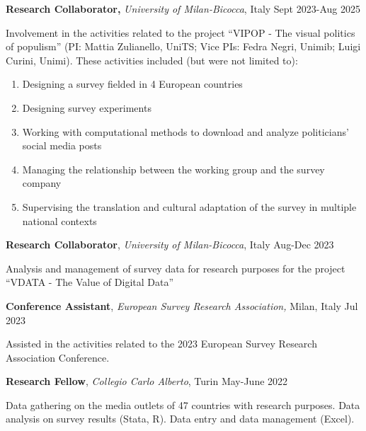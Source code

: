 \documentclass[10pt,]{article}
\providecommand{\tightlist}{%
  \setlength{\itemsep}{0pt}\setlength{\parskip}{0pt}}
\renewenvironment{itemize}{
  \begin{list}{}{
    \setlength{\leftmargin}{1.5em}
  }
}{
  \end{list}
}
\begin{document}
\begin{itemize}
\item
  \textbf{Research Collaborator,} \emph{University of Milan-Bicocca},
  Italy \hfill Sept 2023-Aug 2025

  \begin{itemize}
  \tightlist
  \item
    Involvement in the activities related to the project ``VIPOP - The
    visual politics of populism'' (PI: Mattia Zulianello, UniTS; Vice
    PIs: Fedra Negri, Unimib; Luigi Curini, Unimi). These activities
    included (but were not limited to):

    \begin{enumerate}
    \def\labelenumi{\alph{enumi})}
    \item
      Designing a survey fielded in 4 European countries
    \item
      Designing survey experiments
    \item
      Working with computational methods to download and analyze
      politicians' social media posts
    \item
      Managing the relationship between the working group and the survey
      company
    \item
      Supervising the translation and cultural adaptation of the survey
      in multiple national contexts
    \end{enumerate}
  \end{itemize}
\item
  \textbf{Research Collaborator}, \emph{University of Milan-Bicocca},
  Italy \hfill Aug-Dec 2023

  \begin{itemize}
  \tightlist
  \item
    Analysis and management of survey data for research purposes for the
    project ``VDATA - The Value of Digital Data''
  \end{itemize}
\item
  \textbf{Conference Assistant}, \emph{European Survey Research
  Association,} Milan, Italy \hfill Jul 2023

  \begin{itemize}
  \tightlist
  \item
    Assisted in the activities related to the 2023 European Survey
    Research Association Conference.
  \end{itemize}
\item
  \textbf{Research Fellow}, \emph{Collegio Carlo Alberto}, Turin
  \hfill May-June 2022

  \begin{itemize}
  \tightlist
  \item
    Data gathering on the media outlets of 47 countries with research
    purposes. Data analysis on survey results (Stata, R). Data entry and
    data management (Excel).
  \end{itemize}
\end{itemize}
\end{document}

